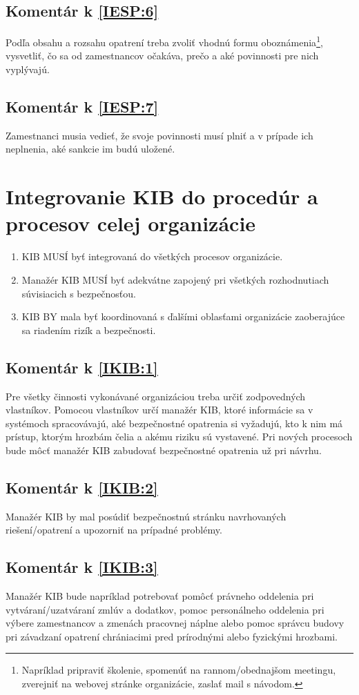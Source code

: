 \subsection*{Komentár k \ref{IESP:6}}
Podľa obsahu a rozsahu opatrení treba zvoliť vhodnú formu oboznámenia\footnote{Napríklad pripraviť školenie, spomenúť na
rannom/obednajšom meetingu, zverejniť na webovej stránke organizácie, zaslať mail s návodom.}, vysvetliť, čo sa od zamestnancov
očakáva, prečo a aké povinnosti pre nich vyplývajú.

\subsection*{Komentár k \ref{IESP:7}}
Zamestnanci musia vedieť, že svoje povinnosti musí plniť a v prípade ich neplnenia, aké sankcie im budú uložené.


\section{Integrovanie KIB do procedúr a procesov celej organizácie}
\begin{enumerate}
  \item \label{IKIB:1} KIB MUSÍ byť integrovaná do všetkých procesov organizácie.
  \item \label{IKIB:2} Manažér KIB MUSÍ byť adekvátne zapojený pri všetkých rozhodnutiach súvisiacich s bezpečnosťou.
  \item \label{IKIB:3} KIB BY mala byť koordinovaná s ďalšími oblasťami organizácie zaoberajúce sa riadením rizík a bezpečnosti.
\end{enumerate}

\subsection*{Komentár k \ref{IKIB:1}}
Pre všetky činnosti vykonávané organizáciou treba určiť zodpovedných vlastníkov. Pomocou vlastníkov určí manažér KIB, ktoré
informácie sa v systémoch spracovávajú, aké bezpečnostné opatrenia si vyžadujú, kto k nim má prístup, ktorým hrozbám čelia
a akému riziku sú vystavené. Pri nových procesoch bude môcť manažér KIB zabudovať bezpečnostné opatrenia už pri návrhu.

\subsection*{Komentár k \ref{IKIB:2}}
Manažér KIB by mal posúdiť bezpečnostnú stránku navrhovaných riešení/opatrení a upozorniť na prípadné problémy.

\subsection*{Komentár k \ref{IKIB:3}}
Manažér KIB bude napríklad potrebovať pomôcť právneho oddelenia pri vytváraní/uzatváraní zmlúv a dodatkov, pomoc personálneho
oddelenia pri výbere zamestnancov a zmenách pracovnej náplne alebo pomoc správcu budovy pri závadzaní opatrení chrániacimi pred
prírodnými alebo fyzickými hrozbami.

